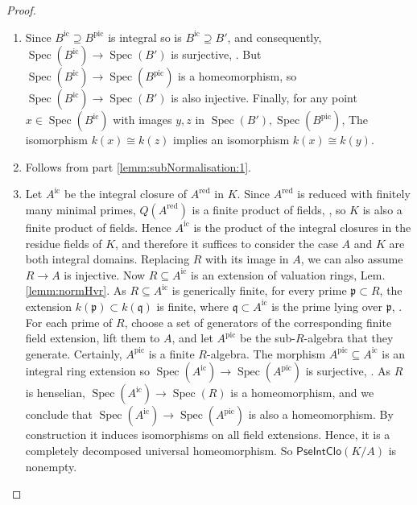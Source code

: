\documentclass[10pt]{amsart}
\theoremstyle{definition}
\newcommand{\p}{\mathfrak{p}}
\newcommand{\q}{\mathfrak{q}}
\DeclareMathOperator{\Spec}{Spec}
\newcommand{\PIC}{\mathsf{PseIntClo}}
\newcommand{\red}{{\operatorname{red}}}
\newcommand{\ic}{{\operatorname{ic}}}
\newcommand{\pic}{{\operatorname{pic}}}
\begin{document}

\begin{proof}\ 
\begin{enumerate}
 \item Since $B^\ic {\supseteq} B^\pic$ is integral so is $B^\ic {\supseteq} B'$, and consequently, $\Spec(B^\ic) \to \Spec(B')$ is surjective, \cite[\href{http://stacks.math.columbia.edu/tag/00GQ}{Tag 00GQ}]{Stacks}. But $\Spec(B^\ic) \to \Spec(B^\pic)$ is a homeomorphism, so $\Spec(B^\ic) \to \Spec(B')$ is also injective. Finally, for any point $x \in \Spec(B^\ic)$ with images $y,z$ in $\Spec(B'), \Spec(B^\pic)$, %
The isomorphism $k(x) \cong k(z)$ implies an isomorphism $k(x) \cong k(y)$.

 \item Follows from part \eqref{lemm:subNormalisation:1}.

 \item Let $A^\ic$ be the integral closure of $A^\red$ in $K$. Since $A^\red$ is reduced with finitely many minimal primes, $Q(A^\red)$ is a finite product of fields, \cite[Tag 02LV]{Stacks}, so $K$ is also a finite product of fields. Hence $A^\ic$ is the product of the integral closures in the residue fields of $K$, and therefore it suffices to consider the case $A$ and $K$ are both integral domains. Replacing $R$ with its image in $A$, we can also assume $R \to A$ is injective. Now $R \subseteq A^\ic$ is an extension of valuation rings, Lem.\ref{lemm:normHvr}. As $R \subseteq A^\ic$ is generically finite, for every prime $\p \subset R$, the extension $k(\p) \subset k(\q)$ is finite, where $\q \subset A^\ic$ is the prime lying over $\p$, \cite[Tag 0ASH]{Stacks}. For each prime of $R$, choose a set of generators of the corresponding finite field extension, lift them to $A$, and let $A^\pic$ be the sub-$R$-algebra that they generate. Certainly, $A^\pic$ is a finite $R$-algebra. The morphism $A^\pic \subseteq A^\ic$ is an integral ring extension so 
 $\Spec(A^\ic) \to \Spec(A^\pic)$ is surjective, \cite[\href{http://stacks.math.columbia.edu/tag/00GQ}{Tag 00GQ}]{Stacks}. As $R$ is henselian, $\Spec(A^\ic) \to \Spec(R)$ is a homeomorphism, and we conclude that $\Spec(A^\ic) \to \Spec(A^\pic)$ is also a homeomorphism. By construction it induces isomorphisms on all field extensions. Hence, it is a completely decomposed universal homeomorphism. So $\PIC(K/A)$ is nonempty.


\end{enumerate}
\end{proof}
\end{document}
